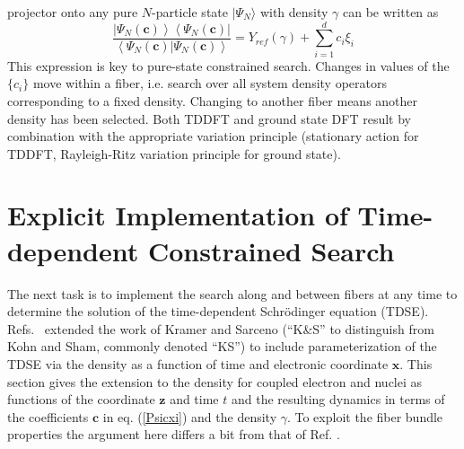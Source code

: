 \documentclass[aps,preprint]{revtex4}%
\begin{document}
projector onto any pure $N$-particle state $|\Psi_{N}\rangle$ with density
$\gamma$ can be written as
\begin{equation}
\frac{\left|  \Psi_{N}(\mathbf{c})\right\rangle \left\langle \Psi
_{N}(\mathbf{c})\right|  }{\left\langle \Psi_{N}(\mathbf{c})|\Psi
_{N}(\mathbf{c})\right\rangle }=Y_{ref}(\gamma)+\sum_{i=1}^{d}c_{i}\xi_{i}
\label{Psicxi}%
\end{equation}
This expression is key to pure-state constrained search. Changes in values of
the $\{c_{i}\}$ move within a fiber, i.e. search over all system density
operators corresponding to a fixed density. Changing to another fiber means
another density has been selected. Both TDDFT and ground state DFT result by
combination with the appropriate variation principle (stationary action for
TDDFT, Rayleigh-Ritz variation principle for ground state).

\section{Explicit Implementation of Time-dependent Constrained Search}

\noindent The next task is to implement the search along and between fibers at
any time to determine the solution of the time-dependent Schr\"odinger
equation (TDSE). Refs.~ extended the work of
Kramer and Sarceno \cite{KramSar} (``K\&S'' to distinguish from Kohn and Sham,
commonly denoted ``KS'') to include parameterization of the TDSE via the
density as a function of time and electronic coordinate $\mathbf{x}$. This
section gives the extension to the density for coupled electron and nuclei as
functions of the coordinate $\mathbf{z}$ and time $t$ and the resulting
dynamics in terms of the coefficients $\mathbf{c}$ in eq. (\ref{Psicxi}) and
the density $\gamma$. To exploit the fiber bundle properties the argument here
differs a bit from that of Ref. .
\end{document}
